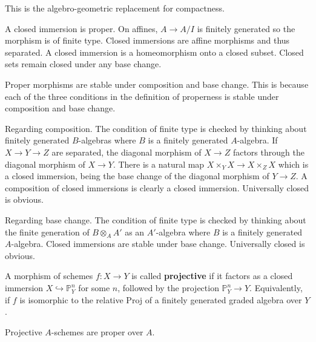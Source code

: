 \documentclass[12pt]{article}
\begin{document}
This is the algebro-geometric replacement for compactness.

\begin{example} A closed immersion is proper. On affines, $A \to A/I$ is finitely generated so the morphism is of finite type. Closed immersions are affine morphisms and thus separated. A closed immersion is a homeomorphism onto a closed subset. Closed sets remain closed under any base change.
\end{example}

\begin{remark}
    Proper morphisms are stable under composition and base change. This is because each of the three conditions in the definition of properness is stable under composition and base change.

    Regarding composition. The condition of finite type is checked by thinking about finitely generated $B$-algebras where $B$ is a finitely generated $A$-algebra. If $X\to Y \to Z$ are separated, the diagonal morphism of $X\to Z$ factors through the diagonal morphism of $X\to Y$. There is a natural map $X\times_Y X \to X\times_Z X$ which is a closed immersion, being the base change of the diagonal morphism of $Y\to Z$. A composition of closed immersions is clearly a closed immersion. Universally closed is obvious.

    Regarding base change. The condition of finite type is checked by thinking about the finite generation of $B\otimes_A A'$ as an $A'$-algebra where $B$ is a finitely generated $A$-algebra. Closed immersions are stable under base change. Universally closed is obvious.
\end{remark}

\begin{definition}
    A morphism of schemes $f:X\to Y$ is called \textbf{projective} if it factors as a closed immersion $X\hookrightarrow \mathbb P^n_Y$ for some $n$, followed by the projection $\mathbb P^n_Y \to Y$. Equivalently, if $f$ is isomorphic to the relative Proj of a finitely generated graded algebra over $Y$.
\end{definition}

\begin{theorem}
    Projective $A$-schemes are proper over $A$.
\end{theorem}
\end{document}
